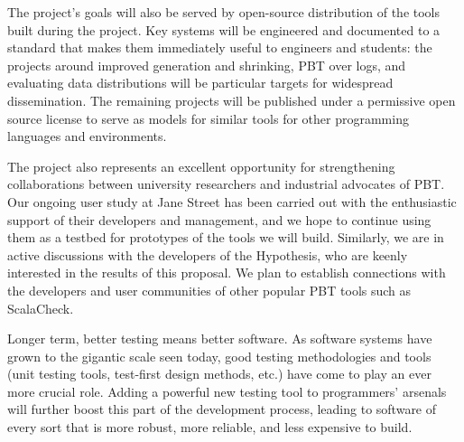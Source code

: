 \smallskip
{}
%
The project's goals will also be served by open-source distribution of the tools
built during the project. Key systems will be engineered and documented to a standard
that makes them immediately useful to engineers and students: the projects around
improved generation and shrinking, PBT over logs, and evaluating data
distributions will be particular targets for widespread
dissemination. The remaining projects will be published under a permissive
open source license to serve as models for similar tools for other programming languages and environments.

The project also represents an excellent opportunity for strengthening
collaborations between university researchers and industrial advocates of PBT.  Our
ongoing user study at Jane Street has been carried out with the
enthusiastic support of their developers and management, and we hope
to continue using them as a testbed for prototypes of the tools we
will build.  Similarly, we are in active discussions with the
developers of the Hypothesis, who are keenly
interested in the results of this proposal.
We plan to establish connections with the
developers and user communities of other popular PBT tools such as
ScalaCheck.

Longer term, better testing means better software.  As software
systems have grown to the gigantic scale seen today, good testing
methodologies and tools (unit testing tools, test-first design
methods, etc.) have come to play an ever more crucial role.  Adding a
powerful new testing tool to programmers' arsenals will further boost
this part of the development process, leading to software of every
sort that is more robust, more reliable, and less expensive to build.




